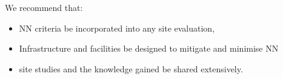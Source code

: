 We recommend that:
\begin{itemize}
\item \ac{NN} criteria be incorporated into any site evaluation,
\item Infrastructure and facilities be designed to mitigate and minimise \ac{NN} 
\item site studies and the knowledge  gained be shared extensively.
\end{itemize}



